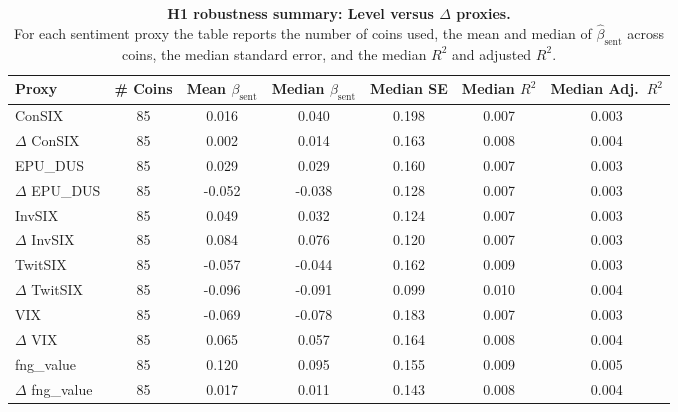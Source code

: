 \begin{table}
\begin{tabular}{lcccc|cc}
\toprule
Proxy & \# Coins & Mean $\beta_{\mathrm{sent}}$ & Median $\beta_{\mathrm{sent}}$ & Median SE & Median $R^2$ & Median Adj.\ $R^2$ \\
\midrule
ConSIX & 85 & 0.016 & 0.040 & 0.198 & 0.007 & 0.003 \\
$\Delta$ ConSIX & 85 & 0.002 & 0.014 & 0.163 & 0.008 & 0.004 \\
EPU_DUS & 85 & 0.029 & 0.029 & 0.160 & 0.007 & 0.003 \\
$\Delta$ EPU_DUS & 85 & -0.052 & -0.038 & 0.128 & 0.007 & 0.003 \\
InvSIX & 85 & 0.049 & 0.032 & 0.124 & 0.007 & 0.003 \\
$\Delta$ InvSIX & 85 & 0.084 & 0.076 & 0.120 & 0.007 & 0.003 \\
TwitSIX & 85 & -0.057 & -0.044 & 0.162 & 0.009 & 0.003 \\
$\Delta$ TwitSIX & 85 & -0.096 & -0.091 & 0.099 & 0.010 & 0.004 \\
VIX & 85 & -0.069 & -0.078 & 0.183 & 0.007 & 0.003 \\
$\Delta$ VIX & 85 & 0.065 & 0.057 & 0.164 & 0.008 & 0.004 \\
fng_value & 85 & 0.120 & 0.095 & 0.155 & 0.009 & 0.005 \\
$\Delta$ fng_value & 85 & 0.017 & 0.011 & 0.143 & 0.008 & 0.004 \\
\bottomrule
\end{tabular}
\caption{\textbf{H1 robustness summary: Level versus $\Delta$ proxies.}\\For each sentiment proxy the table reports the number of coins used, the mean and median of $\hat{\beta}_{\mathrm{sent}}$ across coins, the median standard error, and the median $R^2$ and adjusted $R^2$.}
\label{tab:h1_level_vs_delta_summary}
\end{table}
